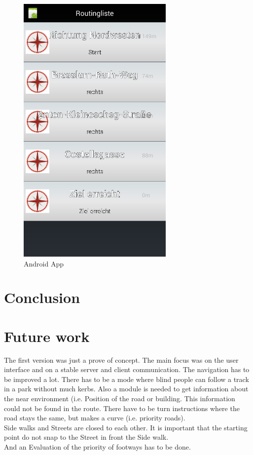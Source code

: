 \documentclass{sig-alternate}
\begin{document}
\begin{figure}
\centering
\includegraphics[width=3in]{App2.png}
\caption{Android App}
\label{fig:app}
\end{figure}


\section{Conclusion}



\section{Future work}
The first version was just a prove of concept. The main focus was on the user interface and on a stable server and client communication. The navigation has to be  improved a lot. There has to be a mode where blind people can follow a track in a park without much kerbs. Also a module is needed to get information about the near environment (i.e. Position of the road or building. This information could not be found in the route. There have to be turn instructions where the road stays the same, but makes a curve (i.e. priority roads). \\
Side walks and Streets are closed to each other. It is important that the starting point do not snap to the Street in front the Side walk. \\
And an Evaluation of the priority of footways has to be done. 
\end{document}
